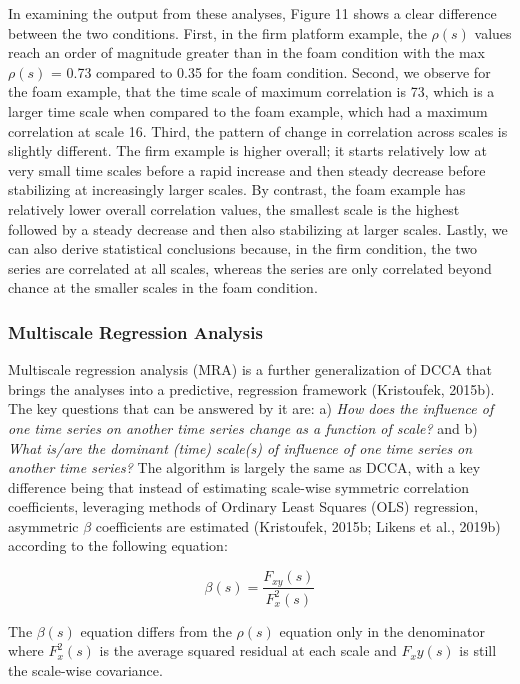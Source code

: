 \documentclass[
  man]{apa6}
\begin{document}
In examining the output from these analyses, Figure 11 shows a clear
difference between the two conditions. First, in the firm platform
example, the \(\rho(s)\) values reach an order of magnitude greater than
in the foam condition with the max \(\rho(s)\) =
0.73 compared to
0.35 for the foam condition. Second, we
observe for the foam example, that the time scale of maximum correlation
is 73,
which is a larger time scale when compared to the foam example, which
had a maximum correlation at scale
16. Third,
the pattern of change in correlation across scales is slightly
different. The firm example is higher overall; it starts relatively low
at very small time scales before a rapid increase and then steady
decrease before stabilizing at increasingly larger scales. By contrast,
the foam example has relatively lower overall correlation values, the
smallest scale is the highest followed by a steady decrease and then
also stabilizing at larger scales. Lastly, we can also derive
statistical conclusions because, in the firm condition, the two series
are correlated at all scales, whereas the series are only correlated
beyond chance at the smaller scales in the foam condition.

\hypertarget{multiscale-regression-analysis}{%
\subsubsection{Multiscale Regression Analysis}\label{multiscale-regression-analysis}}

Multiscale regression analysis (MRA) is a further generalization of DCCA
that brings the analyses into a predictive, regression framework
(Kristoufek, 2015b). The key questions that can be answered by it are: a)
\emph{How does the influence of one time series on another time series change
as a function of scale?} and b) \emph{What is/are the dominant (time)
scale(s) of influence of one time series on another time series?} The
algorithm is largely the same as DCCA, with a key difference being that
instead of estimating scale-wise symmetric correlation coefficients,
leveraging methods of Ordinary Least Squares (OLS) regression,
asymmetric \(\beta\) coefficients are estimated (Kristoufek, 2015b; Likens et al., 2019b) according to the following equation:

\[
\beta(s)=\frac{F_{xy}(s)}{F^2_x(s)}
\]

The \(\beta(s)\) equation differs from the \(\rho(s)\) equation only in the
denominator where \(F^2_x(s)\) is the average squared residual at each
scale and \(F_xy(s)\) is still the scale-wise covariance.
\end{document}
